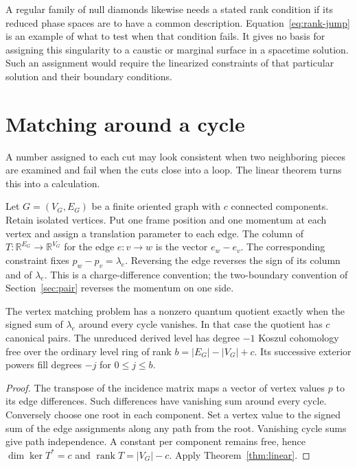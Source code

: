 \documentclass[11pt,letterpaper]{article}
\newcommand{\RR}{\mathbb R}
\begin{document}
A regular family of null diamonds likewise needs a stated rank condition if its reduced phase
spaces are to have a common description. Equation~\eqref{eq:rank-jump} is an example of what to
test when that condition fails. It gives no basis for assigning this singularity to a caustic
or marginal surface in a spacetime solution. Such an assignment would require the linearized
constraints of that particular solution and their boundary conditions.

\section{Matching around a cycle}
\label{sec:cycle}
A number assigned to each cut may look consistent when two neighboring pieces are examined and
fail when the cuts close into a loop. The linear theorem turns this into a calculation.

Let $G=(V_G,E_G)$ be a finite oriented graph with $c$ connected components. Retain isolated
vertices. Put one frame position and one momentum at each vertex and assign a translation
parameter to each edge. The column of $T:\RR^{E_G}\to\RR^{V_G}$ for the edge $e:v\to w$ is the
vector $e_w-e_v$. The corresponding constraint fixes $p_w-p_v=\lambda_e$. Reversing the edge
reverses the sign of its column and of $\lambda_e$. This is a charge-difference convention;
the two-boundary convention of Section~\ref{sec:pair} reverses the momentum on one side.

\begin{corollary}\label{cor:graph}
The vertex matching problem has a nonzero quantum quotient exactly when the signed sum of
$\lambda_e$ around every cycle vanishes. In that case the quotient has $c$ canonical pairs.
The unreduced derived level has degree $-1$ Koszul cohomology free over the ordinary level
ring of rank $b=|E_G|-|V_G|+c$. Its successive exterior powers fill degrees $-j$ for $0\le j\le b$.
\end{corollary}
\begin{proof}
The transpose of the incidence matrix maps a vector of vertex values $p$ to its edge
differences. Such differences have vanishing sum around every cycle. Conversely choose one
root in each component. Set a vertex value to the signed sum of the edge assignments along any
path from the root. Vanishing cycle sums give path independence. A constant per component
remains free, hence $\dim\ker T^*=c$ and $\operatorname{rank}T=|V_G|-c$. Apply
Theorem~\ref{thm:linear}.
\end{proof}
\end{document}
